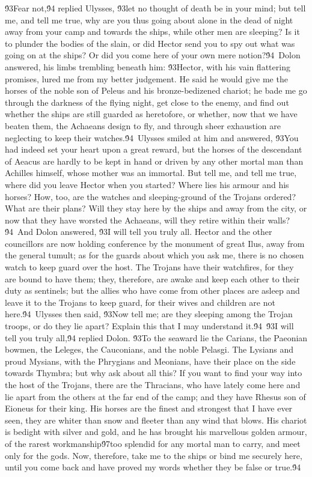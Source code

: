 {\'93Fear not,\'94 replied Ulysses, \'93let no thought of death be in your mind; but tell me, and tell me true, why are you thus going about alone in the dead of night away from your camp and towards the ships, while other men are sleeping? Is it to plunder the bodies of the slain, or did Hector send you to spy out what was going on at the ships? Or did you come here of your own mere notion?\'94\
Dolon answered, his limbs trembling beneath him: \'93Hector, with his vain flattering promises, lured me from my better judgement. He said he would give me the horses of the noble son of Peleus and his bronze-bedizened chariot; he bade me go through the darkness of the flying night, get close to the enemy, and find out whether the ships are still guarded as heretofore, or whether, now that we have beaten them, the Achaeans design to fly, and through sheer exhaustion are neglecting to keep their watches.\'94\
Ulysses smiled at him and answered, \'93You had indeed set your heart upon a great reward, but the horses of the descendant of Aeacus are hardly to be kept in hand or driven by any other mortal man than Achilles himself, whose mother was an immortal. But tell me, and tell me true, where did you leave Hector when you started? Where lies his armour and his horses? How, too, are the watches and sleeping-ground of the Trojans ordered? What are their plans? Will they stay here by the ships and away from the city, or now that they have worsted the Achaeans, will they retire within their walls?\'94\
And Dolon answered, \'93I will tell you truly all. Hector and the other councillors are now holding conference by the monument of great Ilus, away from the general tumult; as for the guards about which you ask me, there is no chosen watch to keep guard over the host. The Trojans have their watchfires, for they are bound to have them; they, therefore, are awake and keep each other to their duty as sentinels; but the allies who have come from other places are asleep and leave it to the Trojans to keep guard, for their wives and children are not here.\'94\
Ulysses then said, \'93Now tell me; are they sleeping among the Trojan troops, or do they lie apart? Explain this that I may understand it.\'94\
\'93I will tell you truly all,\'94 replied Dolon. \'93To the seaward lie the Carians, the Paeonian bowmen, the Leleges, the Cauconians, and the noble Pelasgi. The Lysians and proud Mysians, with the Phrygians and Meonians, have their place on the side towards Thymbra; but why ask about all this? If you want to find your way into the host of the Trojans, there are the Thracians, who have lately come here and lie apart from the others at the far end of the camp; and they have Rhesus son of Eioneus for their king. His horses are the finest and strongest that I have ever seen, they are whiter than snow and fleeter than any wind that blows. His chariot is bedight with silver and gold, and he has brought his marvellous golden armour, of the rarest workmanship\'97too splendid for any mortal man to carry, and meet only for the gods. Now, therefore, take me to the ships or bind me securely here, until you come back and have proved my words whether they be false or true.\'94\
}
